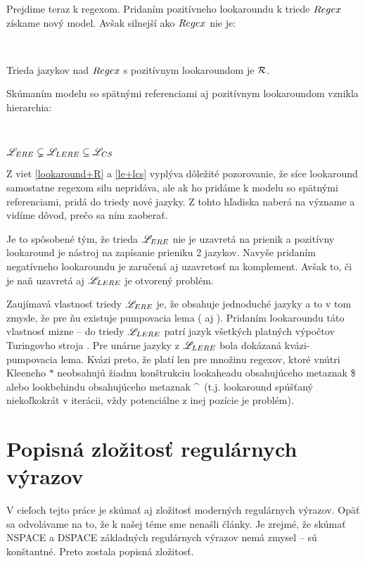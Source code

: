 Prejdime teraz k regexom. Pridaním pozitívneho lookaroundu k triede $Regex$ získame nový model. Avšak silnejší ako $Regex$ nie je:
\begin{veta} \textbf{\emph{\cite[Veta 2.2.10.]{mojaBak}}}\label{lookaround+R} \ \par
Trieda jazykov nad $Regex$ s pozitívnym lookaroundom je ${\cal R}$.
\end{veta}

Skúmaním modelu so spätnými referenciami aj pozitívnym lookaroundom vznikla hierarchia:
\begin{veta}\textbf{\emph{\cite[Vety 2.2.13 a 2.2.14.]{mojaBak}}}\label{le+lcs} \ \par
$ \mathscr{L}_{ERE} \subsetneq \mathscr{L}_{LERE} \subseteq \mathscr{L}_{CS} $
\end{veta}

Z viet \ref{lookaround+R} a \ref{le+lcs} vyplýva dôležité pozorovanie, že síce lookaround samostatne regexom silu nepridáva, ale ak ho pridáme k modelu so spätnými referenciami, pridá do triedy nové jazyky. Z tohto hľadiska naberá na význame a vidíme dôvod, prečo sa ním zaoberať.

Je to spôsobené tým, že trieda $\mathscr{L}_{ERE}$ nie je uzavretá na prienik \cite{ExtendedRegexIntersec} a pozitívny lookaround je nástroj na zapísanie prieniku 2 jazykov. Navyše pridaním negatívneho lookaroundu je zaručená aj uzavretosť na komplement. Avšak to, či je naň uzavretá aj $\mathscr{L}_{LERE}$ je otvorený problém.

Zaujímavá vlastnosť triedy $\mathscr{L}_{ERE}$ je, že obsahuje jednoduché jazyky a to v tom zmysle, že pre ňu existuje pumpovacia lema (\cite{ExtendedRegexPower} aj \cite{ExtendedRegexIntersec}). Pridaním look\-aroundu táto vlastnosť mizne -- do triedy $\mathscr{L}_{LERE}$ patrí jazyk všetkých platných výpočtov Turingovho stroja \cite[Veta 2.2.16.]{mojaBak}. Pre unárne jazyky z $\mathscr{L}_{LERE}$ bola dokázaná kvázi-pumpovacia lema. Kvázi preto, že platí len pre množinu regexov, ktoré vnútri Kleeneho $*$ neobsahujú žiadnu konštrukciu lookaheadu obsahujúceho metaznak \$ alebo lookbehindu obsahujúceho metaznak \textasciicircum ~(t.j. lookaround spúšťaný niekoľkokrát v iterácii, vždy potenciálne z inej pozície je problém).


\section[Popisná zložitosť]{Popisná zložitosť regulárnych výrazov}
\label{uzlozitost}

V cieľoch tejto práce je skúmať aj zložitosť moderných regulárnych výrazov. Opäť sa odvolávame na to, že k našej téme sme nenašli články. Je zrejmé, že skúmať NSPACE a DSPACE základných regulárnych výrazov nemá zmysel -- sú konštantné. Preto zostala popisná zložitosť.

